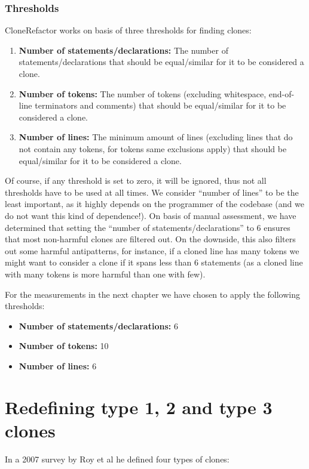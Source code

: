 \documentclass[a4paper]{article}
\begin{document}
\subsubsection{Thresholds}\label{chap:thresholds}
CloneRefactor works on basis of three thresholds for finding clones:
\begin{enumerate}
  \item \textbf{Number of statements/declarations:} The number of statements/declarations that should be equal/similar for it to be considered a clone.
  \item \textbf{Number of tokens:} The number of tokens (excluding whitespace, end-of-line terminators and comments) that should be equal/similar for it to be considered a clone.
  \item \textbf{Number of lines:} The minimum amount of lines (excluding lines that do not contain any tokens, for tokens same exclusions apply) that should be equal/similar for it to be considered a clone.
\end{enumerate}
Of course, if any threshold is set to zero, it will be ignored, thus not all thresholds have to be used at all times. We consider ``number of lines'' to be the least important, as it highly depends on the programmer of the codebase (and we do not want this kind of dependence!). On basis of manual assessment, we have determined that setting the ``number of statements/declarations'' to 6 ensures that most non-harmful clones are filtered out. On the downside, this also filters out some harmful antipatterns, for instance, if a cloned line has many tokens we might want to consider a clone if it spans less than 6 statements (as a cloned line with many tokens is more harmful than one with few).

For the measurements in the next chapter we have chosen to apply the following thresholds:
\begin{itemize}
  \item \textbf{Number of statements/declarations:} 6
  \item \textbf{Number of tokens:} 10
  \item \textbf{Number of lines:} 6
\end{itemize}

\section{Redefining type 1, 2 and type 3 clones}\label{chap:clonetypes}
In a 2007 survey by Roy et al \cite{roy2007survey} he defined four types of clones:
\end{document}
